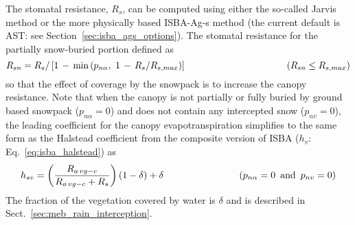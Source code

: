 %
The stomatal resistance, $R_s$, 
can be computed using either the so-called Jarvis 
method 
or the more physically based ISBA-Ag-s method 
(the current default is AST: see Section~\ref{sec:isba_ags_options}).
The stomatal resistance for the partially
snow-buried portion defined as
%
\begin{equation}
\label{eq:meb_rs_snow}
R_{sn} = R_s/\left[ 
1 \,-\, {\textrm{min}}\left(
p_{n \alpha}, \,\, 
1 \,-\, R_s/R_{s,max}
\right)\right]
\hskip1.5in
\left( R_{sn} \leq R_{s,max} \right)
\end{equation}
%
so that the effect of coverage by the snowpack is to increase the canopy
resistance.
%
%
Note that when the canopy is not partially or fully 
buried by ground based snowpack ($p_{n \alpha}=0$) and
does not contain any intercepted snow ($p_{nv}=0$),
the leading coefficient for the canopy evapotranspiration 
simplifies to the same form as the Halstead coefficient
from the composite version of ISBA ($h_v$: Eq.~\ref{eq:isba_halstead}) as
%
\begin{equation}
\label{eq:meb_hv}
%
h_{sv} = \left({\frac{R_{a\,vg-c}}{R_{a\,vg-c} + R_{s}}}\right)
\left(1-\delta\right) + \delta \,\,\,
\hskip1.in
\left(p_{n \alpha}=0 \,\,\, {\textrm{and}} \,\,\, p_{nv}=0\right)
%
\end{equation}
%
The fraction of the vegetation covered by water is $\delta$
and is described in Sect.~\ref{sec:meb_rain_interception}.
%

